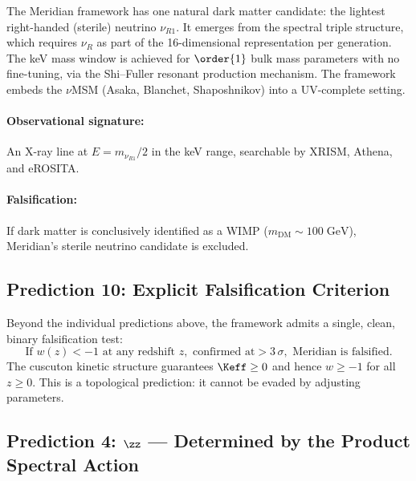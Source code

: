 The Meridian framework has one natural dark matter candidate: the lightest right-handed (sterile) neutrino $\nu_{R1}$. It emerges from the spectral triple structure, which requires $\nu_R$ as part of the 16-dimensional representation per generation. The keV mass window is achieved for $\order{1}$ bulk mass parameters with no fine-tuning, via the Shi--Fuller resonant production mechanism. The framework embeds the $\nu$MSM (Asaka, Blanchet, Shaposhnikov) into a UV-complete setting.

\paragraph{Observational signature:} An X-ray line at $E = m_{\nu_{R1}}/2$ in the keV range, searchable by XRISM, Athena, and eROSITA.

\paragraph{Falsification:} If dark matter is conclusively identified as a WIMP ($m_\mathrm{DM} \sim 100\;\mathrm{GeV}$), Meridian's sterile neutrino candidate is excluded.

\subsection{Prediction 10: Explicit Falsification Criterion}
\label{sec:1-pred10}

Beyond the individual predictions above, the framework admits a single, clean, binary falsification test:
\begin{equation}
\label{eq:1-phantom-falsification}
\boxed{\text{If } w(z) < -1 \text{ at any redshift } z, \text{ confirmed at} > 3\,\sigma, \text{ Meridian is falsified.}}
\end{equation}
The cuscuton kinetic structure guarantees $\Keff \geq 0$ and hence $w \geq -1$ for all $z \geq 0$. This is a topological prediction: it cannot be evaded by adjusting parameters.


%

\subsection{Prediction 4: \texorpdfstring{$\zz$}{zeta0} --- Determined by the Product Spectral Action}
\label{sec:1-pred4}

